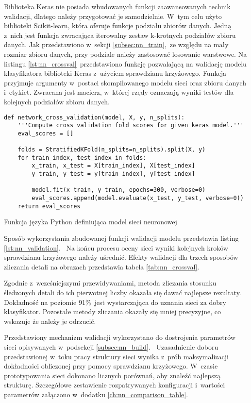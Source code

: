 Biblioteka Keras nie posiada wbudowanych funkcji zaawansowanych technik
walidacji, dlatego należy przygotować je samodzielnie.
W~tym celu użyto biblioteki Scikit-learn, która oferuje funkcje podziału zbiorów
danych.
Jedną z~nich jest funkcja zwracająca iterowalny zestaw k-krotnych podziałów
zbioru danych.
Jak przedstawiono w~sekcji \ref{subsec:nn_train},~ze względu na mały rozmiar
zbioru danych, przy podziale należy zastosować losowanie warstwowe.
Na listingu \ref{lst:nn_crossval}~przedstawiono funkcję pozwalającą na walidację
modelu klasyfikatora biblioteki Keras z~użyciem sprawdzianu krzyżowego.
Funkcja przyjmuje argumenty w~postaci skompilowanego modelu sieci oraz zbioru
danych i~etykiet.
Zwracana jest macierz, w~której rzędy oznaczają wyniki testów dla kolejnych
podziałów zbioru danych.
\begin{listing}[tb]
\begin{verbatim}
def network_cross_validation(model, X, y, n_splits):
    '''Compute cross validation fold scores for given keras model.'''
    eval_scores = []

    folds = StratifiedKFold(n_splits=n_splits).split(X, y)
    for train_index, test_index in folds:
        x_train, x_test = X[train_index], X[test_index]
        y_train, y_test = y[train_index], y[test_index]

        model.fit(x_train, y_train, epochs=300, verbose=0)
        eval_scores.append(model.evaluate(x_test, y_test, verbose=0))
    return eval_scores
\end{verbatim}
\caption{Funkcja języka Python definiująca model sieci neuronowej}
\label{lst:nn_crossval}
\end{listing}
Sposób wykorzystania zbudowanej funkcji walidacji modelu przedstawia listing
\ref{lst:nn_validation}.~%
Na końcu procesu oceny sieci wyniki kolejnych kroków sprawdzianu krzyżowego
należy uśrednić.
Efekty walidacji dla trzech sposobów zliczania detali na obrazach przedstawia
tabela \ref{tab:nn_crossval}.

Zgodnie z~wcześniejszymi przewidywaniami, metoda zliczania stosunku śledzonych
detali do ich pierwotnej liczby okazała się dawać najlepsze rezultaty.
Dokładność na poziomie 91\%~jest wystarczająca do uznania sieci za dobry
klasyfikator.
Pozostałe metody zliczania okazały się mniej precyzyjne, co wskazuje że należy
je odrzucić.

Przedstawiony mechanizm walidacji wykorzystano do dostrojenia parametrów sieci
opisywanych w~podsekcji \ref{subsec:nn_build}.~%
Uzasadnienie doboru przedstawionej w~toku pracy struktury sieci wynika z~prób
maksymalizacji dokładności obliczonej przy pomocy sprawdzianu krzyżowego.
W~czasie prototypowania sieci dokonano licznych porównań, aby znaleźć najlepszą
strukturę.
Szczegółowe zestawienie rozpatrywanych konfiguracji i~wartości parametrów
załączono w~dodatku \ref{ch:nn_comparison_table}.

